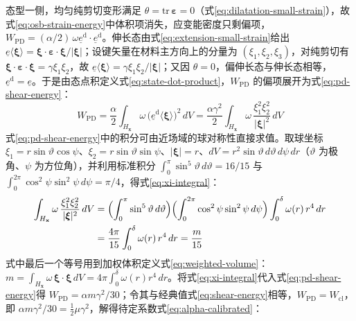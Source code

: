 态型一侧，均匀纯剪切变形满足 $\theta=\mathrm{tr}\,\boldsymbol{\varepsilon}=0$（式\eqref{eq:dilatation-small-strain}），故式\eqref{eq:osb-strain-energy}中体积项消失，应变能密度只剩偏项，$W_{\mathrm{PD}}=(\alpha/2)\,\omega\underline{e}^{\mathrm{d}}\cdot\underline{e}^{\mathrm{d}}$。伸长态由式\eqref{eq:extension-small-strain}给出 $\underline{e}\langle\boldsymbol{\xi}\rangle=\boldsymbol{\xi}\cdot\boldsymbol{\varepsilon}\cdot\boldsymbol{\xi}/|\boldsymbol{\xi}|$；设键矢量在材料主方向上的分量为 $(\xi_{1},\xi_{2},\xi_{3})$，对纯剪切有 $\boldsymbol{\xi}\cdot\boldsymbol{\varepsilon}\cdot\boldsymbol{\xi}=\gamma\xi_{1}\xi_{2}$，故 $\underline{e}\langle\boldsymbol{\xi}\rangle=\gamma\xi_{1}\xi_{2}/|\boldsymbol{\xi}|$；又因 $\theta=0$，偏伸长态与伸长态相等，$\underline{e}^{\mathrm{d}}=\underline{e}$。于是由态点积定义式\eqref{eq:state-dot-product}，$W_{\mathrm{PD}}$ 的偏项展开为式\eqref{eq:pd-shear-energy}：
\begin{equation}
  W_{\mathrm{PD}}=\frac{\alpha}{2}\int_{H_{\mathbf{x}}}\omega\,\bigl(\underline{e}^{\mathrm{d}}\langle\boldsymbol{\xi}\rangle\bigr)^{2}\,dV
  =\frac{\alpha\gamma^{2}}{2}\int_{H_{\mathbf{x}}}\omega\,\frac{\xi_{1}^{2}\xi_{2}^{2}}{|\boldsymbol{\xi}|^{2}}\,dV
  \label{eq:pd-shear-energy}
\end{equation}
式\eqref{eq:pd-shear-energy}中的积分可由近场域的球对称性直接求值。取球坐标 $\xi_{1}=r\sin\vartheta\cos\psi$、$\xi_{2}=r\sin\vartheta\sin\psi$、$|\boldsymbol{\xi}|=r$、$dV=r^{2}\sin\vartheta\,d\vartheta\,d\psi\,dr$（$\vartheta$ 为极角、$\psi$ 为方位角），并利用标准积分 $\int_{0}^{\pi}\sin^{5}\vartheta\,d\vartheta=16/15$ 与 $\int_{0}^{2\pi}\cos^{2}\psi\sin^{2}\psi\,d\psi=\pi/4$，得式\eqref{eq:xi-integral}：
\begin{equation}
  \begin{aligned}
    \int_{H_{\mathbf{x}}}\omega\,\frac{\xi_{1}^{2}\xi_{2}^{2}}{|\boldsymbol{\xi}|^{2}}\,dV
    &=\Bigl(\int_{0}^{\pi}\sin^{5}\vartheta\,d\vartheta\Bigr)
    \Bigl(\int_{0}^{2\pi}\cos^{2}\psi\sin^{2}\psi\,d\psi\Bigr)
    \int_{0}^{\delta}\omega(r)\,r^{4}\,dr\\
    &=\frac{4\pi}{15}\int_{0}^{\delta}\omega(r)\,r^{4}\,dr
    =\frac{m}{15}
  \end{aligned}
  \label{eq:xi-integral}
\end{equation}
式中最后一个等号用到加权体积定义式\eqref{eq:weighted-volume}：$m=\int_{H_{\mathbf{x}}}\omega\,\boldsymbol{\xi}\cdot\boldsymbol{\xi}\,dV=4\pi\int_{0}^{\delta}\omega(r)r^{4}\,dr$。将式\eqref{eq:xi-integral}代入式\eqref{eq:pd-shear-energy}得 $W_{\mathrm{PD}}=\alpha m\gamma^{2}/30$；令其与经典值式\eqref{eq:shear-energy}相等，$W_{\mathrm{PD}}=W_{\mathrm{cl}}$，即 $\alpha m\gamma^{2}/30=\tfrac{1}{2}\mu\gamma^{2}$，解得待定系数式\eqref{eq:alpha-calibrated}：
